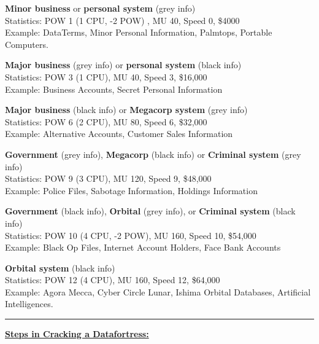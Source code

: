 \documentclass[11pt,twoside,a4paper]{article}
\newenvironment{local_enumerate}{
\begin{enumerate}
     \setlength{\itemsep}{1pt}
     \setlength{\parskip}{0pt}
     \setlength{\parsep}{0pt}}
{\end{enumerate}
}
\begin{document}
\begin{multicols}{2}
\begin{local_enumerate}
	\item \textbf{Minor business} or \textbf{personal system} (grey info) ~\\
		Statistics: POW 1 (1 CPU, -2 POW) , MU 40, Speed 0, \$4000 ~\\
		Example: DataTerms, Minor Personal Information, Palmtops, Portable Computers.
	\item \textbf{Major business} (grey info) or \textbf{personal system} (black info) ~\\
		Statistics: POW 3 (1 CPU), MU 40, Speed 3, \$16,000 ~\\
		Example: Business Accounts, Secret Personal Information
	\item \textbf{Major business} (black info) or \textbf{Megacorp system} (grey info) ~\\
		Statistics: POW 6 (2 CPU), MU 80, Speed 6, \$32,000 ~\\
		Example: Alternative Accounts, Customer Sales Information
	\item \textbf{Government} (grey info), \textbf{Megacorp} (black info) or \textbf{Criminal system} (grey info) ~\\
		Statistics: POW 9 (3 CPU), MU 120, Speed 9, \$48,000 ~\\
		Example: Police Files, Sabotage Information, Holdings Information
	\item \textbf{Government} (black info), \textbf{Orbital} (grey info), or \textbf{Criminal system} (black info) ~\\
		Statistics: POW 10 (4 CPU, -2 POW), MU 160, Speed 10, \$54,000 ~\\
		Example: Black Op Files, Internet Account Holders, Face Bank Accounts
	\item \textbf{Orbital system} (black info) ~\\
		Statistics: POW 12 (4 CPU), MU 160, Speed 12, \$64,000 ~\\
		Example: Agora Mecca, Cyber Circle Lunar, Ishima Orbital Databases, Artificial Intelligences.
\end{local_enumerate} %

\end{multicols}

\begin{center} \rule{0.85\textwidth}{0.01cm} \end{center}

\textbf{\underline{\large Steps in Cracking a Datafortress:}} %
\end{document}
